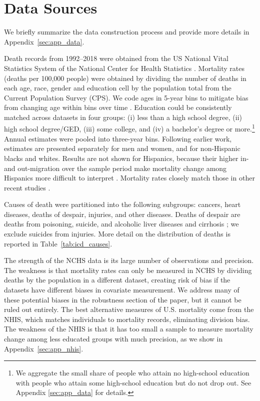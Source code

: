 \documentclass[12pt,letterpaper]{article}
\numberwithin{equation}{section}
\begin{document}
\section{Data Sources}
\label{sec:data}

We briefly summarize the data construction process and provide more
details in Appendix~\ref{sec:app_data}.

Death records from 1992--2018 were obtained from the US National Vital
Statistics System of the National Center for Health Statistics
\citep{NCHS2018}. Mortality rates (deaths per 100,000 people) were
obtained by dividing the number of deaths in each age, race, gender
and education cell by the population total from the Current
Population Survey (CPS). We code ages in 5-year bins to mitigate
bias from changing age within bins over time
\citep{Gelman2016,Case2017}. Education could be consistently matched
across datasets in four groups: (i) less than a high school degree,
(ii) high school degree/GED, (iii) some college, and (iv) a bachelor's
degree or more.\footnote{We aggregate the small share of people who attain no high-school
  education with people who attain some high-school education but do
  not drop out. See Appendix \ref{sec:app_data} for details.} Annual estimates were pooled into three-year bins.
Following earlier work, estimates are presented separately for men and
women, and for non-Hispanic blacks and whites. Results are not shown
for Hispanics, because their higher in- and out-migration over the
sample period make mortality change among Hispanics more difficult to
interpret \citep{Markides2005}. Mortality rates closely match those in
other recent studies \citep{Case2015,Case2017}.

Causes of death were partitioned into the following subgroups:
cancers, heart diseases, deaths of despair, injuries, and other
diseases. Deaths of despair are deaths from poisoning, suicide, and
alcoholic liver diseases and cirrhosis \citep{Kochanek2016,Case2017};
we exclude suicides from injuries. More detail on the distribution of
deaths is reported in Table~\ref{tab:icd_causes}. 

The strength of the NCHS data is its large number of observations and precision. The weakness is that mortality rates can only be measured in NCHS by dividing deaths by the population in a different dataset, creating risk of bias if the datasets have different biases in covariate measurement. We address many of these potential biases in the robustness section of the paper, but it cannot be ruled out entirely. The best alternative measures of U.S. mortality come from the NHIS, which matches individuals to mortality records, eliminating division bias. The weakness of the NHIS is that it has too small a sample to measure mortality change among less educated groups with much precision, as we show in Appendix~\ref{sec:app_nhis}.
\end{document}
